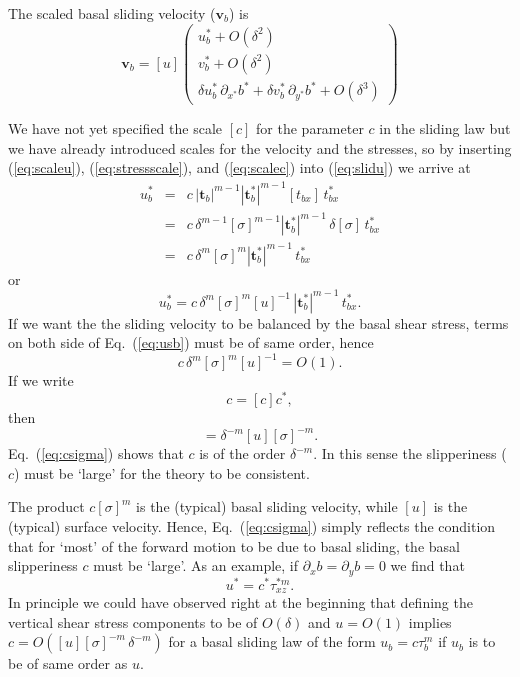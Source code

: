 \documentclass[10pt,a4paper]{book}
\newcommand{\p}{\partial}
\newcommand{\de}{\delta}
\newcommand{\txz}{\tau_{xz}}
\begin{document}
The scaled basal sliding velocity ($\bm{v}_b$) is
\begin{equation}
\bm{v}_b= [u] \left ( \begin{array}{c}
 u_b^*+O(\de^2) \\
 v_b^*+O(\de^2)\\
 \de u_b^* \, \p_{x^*} b^* +\de v_b^* \,\p_{y^*} b^* +O(\de^3)
        \end{array} \right ) 
\label{eq:vscaled}
\end{equation}


We have not yet specified the scale $[c]$ for the parameter $c$ in the sliding law but we have
already introduced scales for the velocity and the stresses, so by inserting (\ref{eq:scaleu}),
(\ref{eq:stressscale}), and (\ref{eq:scalec}) into (\ref{eq:slidu}) we arrive at
\begin{eqnarray}
[u] u^*_b &=& c  \,|\bm{t}_b|^{m-1} |\bm{t}_b^*|^{m-1} [t_{bx}] \, t_{bx}^* \nonumber \\
       &=&  c  \,\de^{m-1} [\sigma]^{m-1} |\bm{t}_b^*|^{m-1} \, \de [\sigma] \, t_{bx}^* \nonumber \\
       &=&  c  \,\de^{m} [\sigma]^{m} |\bm{t}_b^*|^{m-1} \, t_{bx}^* \nonumber 
\end{eqnarray}
or
\begin{equation}
u^*_b= c \,\de^{m} [\sigma]^{m} [u]^{-1} \, |\bm{t}_b^*|^{m-1} \, t_{bx}^*  .
\label{eq:usb}
\end{equation}
If we want the the sliding velocity to be balanced by the basal shear stress, terms on both side of
Eq.~(\ref{eq:usb}) must be of same order, hence
\[
c \,\de^{m} [\sigma]^{m} [u]^{-1}=O(1) .
\]
If we write
\begin{equation}
c=[c] c^* ,
\label{eq:scalec}
\end{equation}
then
\begin{equation}
[c]= \de^{-m} [u] [\sigma]^{-m} .
\label{eq:csigma}
\end{equation}
Eq.~(\ref{eq:csigma}) shows that $c$ is of the order $\de^{-m}$. In this
sense the slipperiness ($c$) must be `large' for the theory to be
consistent. 


The product $c [\sigma]^m$ is the (typical) basal sliding velocity,
while $[u]$ is the (typical) surface velocity. Hence,
Eq.~(\ref{eq:csigma}) simply reflects the condition that for `most' of
the forward motion to be due to basal sliding, the basal slipperiness
$c$ must be `large'.  As an example, if $\p_x b=\p_y b=0$ we find that
\[
u^*= c^* \txz^{*m}.
\]
In principle we could have observed right at the beginning that 
defining the vertical shear stress components to be of $O(\de)$ and $u=O(1)$ implies
$c=O([u] [\sigma]^{-m}\,\de^{-m})$ for a basal sliding law of the form $u_b=c \tau_b^m$
if $u_b$ is to be of same order as $u$.
\end{document}

